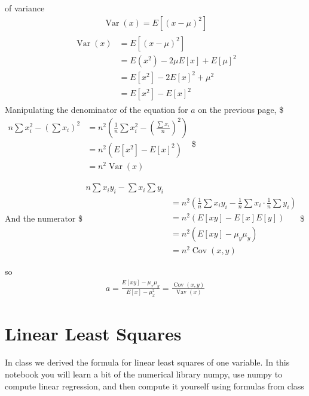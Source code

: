 \documentclass[letterpaper,10pt,english]{jupyterBook}
\begin{document}
\sphinxAtStartPar
{} of variance
\begin{equation*}
\begin{split}\operatorname{Var}(x)=E\left[(x-\mu)^{2}\right]\end{split}
\end{equation*}
\sphinxAtStartPar
{}
\begin{equation*}
\begin{split}
\begin{aligned}
\operatorname{Var}(x)&=E\left[(x-\mu)^{2}\right] \\
&=E\left(x^{2}\right)-2 \mu E[x]+E[\mu]^{2} \\
&=E\left[x^{2}\right]-2 E[x]^{2}+\mu^{2} \\
&=E\left[x^{2}\right]-E[x]^{2}
\end{aligned}
\end{split}
\end{equation*}
\sphinxAtStartPar
Manipulating the denominator of the equation for \(a\) on the previous page,
\$\(
\begin{aligned}
n \sum x_{i}^{2}-\left(\sum x_{i}\right)^{2} & =n^{2}\left(\frac{1}{n} \sum x_{i}^{2}-\left(\frac{\sum x_{i}}{n}\right)^{2}\right) \\
& =n^{2}\left(E\left[x^{2}\right]-E[x]^{2}\right) \\
& =n^{2} \operatorname{Var}(x)
\end{aligned}
\)\$

\sphinxAtStartPar
And the numerator
\$\(
\begin{aligned}
n \sum x_{i} y_{i}-\sum x_{i} \sum y_{i} \\
& =n^{2}\left(\frac{1}{n} \sum x_{i} y_{i}-\frac{1}{n} \sum x_{i} \cdot\frac1n \sum y_{i}\right) \\
& =n^{2}\left(E\left[x y\right]-E[x] E[y]\right) \\
& =n^{2}\left(E[x y]-\mu_{y} \mu_{y}\right) \\
& = n^2 \operatorname{Cov}(x,y)
\end{aligned}
\)\$

\sphinxAtStartPar
so
\begin{equation*}
\begin{split}a=\frac{E[x y]-\mu_{x} \mu_{y}}{E[x]-\mu_{x}^{2}}=\frac{\operatorname{Cov}(x, y)}{\operatorname{Vav}(x)}\end{split}
\end{equation*}
\sphinxstepscope


\chapter{Linear Least Squares}
\label{\detokenize{lessons/least-squares-01:linear-least-squares}}\label{\detokenize{lessons/least-squares-01::doc}}
\sphinxAtStartPar
In class we derived the formula for linear least squares of one variable. In this notebook you will learn a bit of the numerical library numpy, use numpy to compute linear regression, and then compute it yourself using formulas from class
\end{document}
